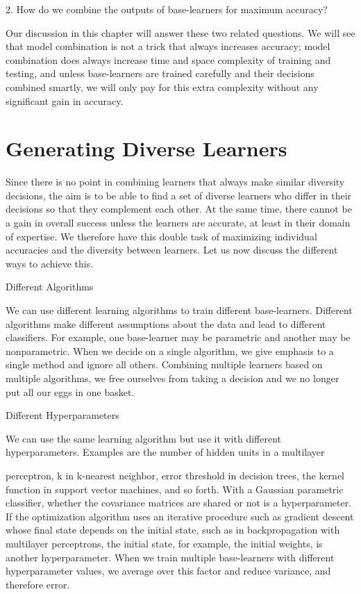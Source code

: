 2. How do we combine the outputs of base-learners for maximum accuracy?

Our discussion in this chapter will answer these two related questions. We will see that model combination is not a trick that always increases accuracy; model combination does always increase time and space complexity of training and testing, and unless base-learners are trained carefully and their decisions combined smartly, we will only pay for this extra complexity without any significant gain in accuracy.

\section{Generating Diverse Learners}

Since there is no point in combining learners that always make similar diversity decisions, the aim is to be able to find a set of diverse learners who differ in their decisions so that they complement each other. At the same time, there cannot be a gain in overall success unless the learners are accurate, at least in their domain of expertise. We therefore have this double task of maximizing individual accuracies and the diversity between learners. Let us now discuss the different ways to achieve this.

Different Algorithms

We can use different learning algorithms to train different base-learners. Different algorithms make different assumptions about the data and lead to different classifiers. For example, one base-learner may be parametric and another may be nonparametric. When we decide on a single algorithm, we give emphasis to a single method and ignore all others. Combining multiple learners based on multiple algorithms, we free ourselves from taking a decision and we no longer put all our eggs in one basket.

Different Hyperparameters

We can use the same learning algorithm but use it with different hyperparameters. Examples are the number of hidden units in a multilayer

perceptron, k in k-nearest neighbor, error threshold in decision trees, the kernel function in support vector machines, and so forth. With a Gaussian parametric classifier, whether the covariance matrices are shared or not is a hyperparameter. If the optimization algorithm uses an iterative procedure such as gradient descent whose final state depends on the initial state, such as in backpropagation with multilayer perceptrons, the initial state, for example, the initial weights, is another hyperparameter. When we train multiple base-learners with different hyperparameter values, we average over this factor and reduce variance, and therefore error.

